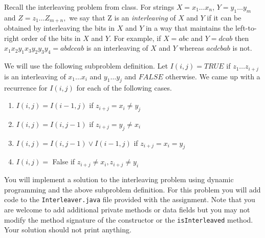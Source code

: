 \documentclass[11pt]{exam}
\begin{document}
\begin{questions}

    
\question[5] 
Recall the interleaving problem from class.  For strings $X=x_1 \dots x_n$, $Y=y_1 \ldots y_m$ and $Z = z_1 \ldots Z_{m+n},$ we say that Z is an \emph{interleaving} of $X$ and $Y$ if it can be obtained by interleaving the bits in $X$ and $Y$ in a way that maintains the left-to-right order of the bits in $X$ and $Y.$  For example, if $X = abc$ and $Y=dcab$ then $x_1x_2y_1x_3y_2y_3y_4=abdccab$ is an interleaving of $X$ and $Y$ whereas $acdcbab$ is not.  

We will use the following subproblem definition.  Let $I(i,j)= TRUE$ if $z_1 \ldots z_{i+j}$ is an interleaving of $x_1 \ldots x_i$ and $y_1 \ldots y_j$ and $FALSE$ otherwise.  We came up with a recurrence for $I(i,j)$ for each of the following cases.\\


\begin{enumerate}
\item $I(i,j) = I(i-1,j)$ if $z_{i+j} = x_i \neq y_j$\\ 
\item $I(i,j) =  I(i,j-1)$ if $ z_{i+j} = y_j \neq x_i$\\ 
\item $I(i,j) = I(i,j-1) \lor I(i-1,j)$  if $z_{i+j} = x_i =y_j$\\ 
\item $I(i,j) = $ False  if $z_{i+j} \neq x_i, z_{i+j} \neq y_i$\\
\end{enumerate}

You will implement a solution to the interleaving problem using dynamic programming and the above subproblem definition. For this problem you will add code to the \texttt{Interleaver.java} file provided with the assignment.  Note that you are welcome to add additional private methods or data fields but you may not modify the method signature of the constructor or the \texttt{isInterleaved} method.  Your solution should not print anything.
\begin{parts}

\end{parts}
\end{questions}
\end{document}
